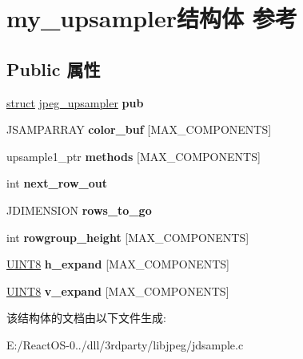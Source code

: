 \hypertarget{structmy__upsampler}{}\section{my\+\_\+upsampler结构体 参考}
\label{structmy__upsampler}
\subsection*{Public 属性}
\begin{DoxyCompactItemize}
\item 
\mbox{\label{structmy__upsampler_a34dcee6f85a807bcacec127661432823}} 
\hyperlink{interfacestruct}{struct} \hyperlink{structjpeg__upsampler}{jpeg\+\_\+upsampler} {\bfseries pub}
\item 
\mbox{\label{structmy__upsampler_a72da5ad87430b974aeabce55c30eb653}} 
J\+S\+A\+M\+P\+A\+R\+R\+AY {\bfseries color\+\_\+buf} \mbox{[}M\+A\+X\+\_\+\+C\+O\+M\+P\+O\+N\+E\+N\+TS\mbox{]}
\item 
\mbox{\label{structmy__upsampler_a3f1f669c2871ccaee6009ec6f96899d3}} 
upsample1\+\_\+ptr {\bfseries methods} \mbox{[}M\+A\+X\+\_\+\+C\+O\+M\+P\+O\+N\+E\+N\+TS\mbox{]}
\item 
\mbox{\label{structmy__upsampler_a9e77765267bd21be6cb005b748034d76}} 
int {\bfseries next\+\_\+row\+\_\+out}
\item 
\mbox{\label{structmy__upsampler_a1a6b9998ad6a7501dd5287295fd8adc4}} 
J\+D\+I\+M\+E\+N\+S\+I\+ON {\bfseries rows\+\_\+to\+\_\+go}
\item 
\mbox{\label{structmy__upsampler_a05806e1394a2638e4912da137b9d4bcd}} 
int {\bfseries rowgroup\+\_\+height} \mbox{[}M\+A\+X\+\_\+\+C\+O\+M\+P\+O\+N\+E\+N\+TS\mbox{]}
\item 
\mbox{\label{structmy__upsampler_a4a82028e54b1f7e57b2c1f7d63290f65}} 
\hyperlink{_processor_bind_8h_ab27e9918b538ce9d8ca692479b375b6a}{U\+I\+N\+T8} {\bfseries h\+\_\+expand} \mbox{[}M\+A\+X\+\_\+\+C\+O\+M\+P\+O\+N\+E\+N\+TS\mbox{]}
\item 
\mbox{\label{structmy__upsampler_a48df5e8df66ba2f1275f54a617eaf888}} 
\hyperlink{_processor_bind_8h_ab27e9918b538ce9d8ca692479b375b6a}{U\+I\+N\+T8} {\bfseries v\+\_\+expand} \mbox{[}M\+A\+X\+\_\+\+C\+O\+M\+P\+O\+N\+E\+N\+TS\mbox{]}
\end{DoxyCompactItemize}


该结构体的文档由以下文件生成\+:\begin{DoxyCompactItemize}
\item 
E\+:/\+React\+O\+S-\/0../dll/3rdparty/libjpeg/jdsample.\+c\end{DoxyCompactItemize}
